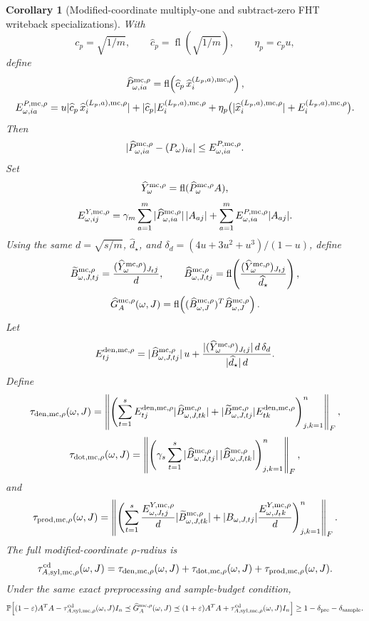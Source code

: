 \documentclass[11pt]{article}
\newcommand{\Prob}{\mathbb{P}}
\newcommand{\fl}{\operatorname{fl}}
\newcommand{\I}{I}
\newcommand{\eps}{\varepsilon}
\newtheorem{corollary}[theorem]{Corollary}
\theoremstyle{remark}
\begin{document}
\begin{corollary}[Modified-coordinate multiply-one and subtract-zero FHT writeback specializations]
With
\[
  c_p=\sqrt{1/m},\qquad
  \widehat c_p=\fl(\sqrt{1/m}),\qquad
  \eta_p=c_pu,
\]
define
\[
  \widehat P^{{\rm mc},\rho}_{\omega,ia}
  =
  \fl\!\left(
    \widehat c_p\,\widehat x_i^{(L_p,a),{\rm mc},\rho}
  \right),
\]
\[
  E^{P,{\rm mc},\rho}_{\omega,ia}
  =
  u|\widehat c_p\,\widehat x_i^{(L_p,a),{\rm mc},\rho}|
  +
  |\widehat c_p|E_i^{(L_p,a),{\rm mc},\rho}
  +
  \eta_p\bigl(
    |\widehat x_i^{(L_p,a),{\rm mc},\rho}|
    +E_i^{(L_p,a),{\rm mc},\rho}
  \bigr).
\]
Then
\[
  |\widehat P^{{\rm mc},\rho}_{\omega,ia}-(P_\omega)_{ia}|
  \le E^{P,{\rm mc},\rho}_{\omega,ia}.
\]
Set
\[
  \widehat Y^{{\rm mc},\rho}_\omega
  =
  \fl(\widehat P^{{\rm mc},\rho}_\omega A),
\]
\[
  E^{Y,{\rm mc},\rho}_{\omega,ij}
  =
  \gamma_m\sum_{a=1}^m
    |\widehat P^{{\rm mc},\rho}_{\omega,ia}|\,|A_{aj}|
  +
  \sum_{a=1}^m E^{P,{\rm mc},\rho}_{\omega,ia}|A_{aj}|.
\]
Using the same \(d=\sqrt{s/m}\), \(\widehat d_\star\), and
\(\delta_d=(4u+3u^2+u^3)/(1-u)\), define
\[
  \widetilde B^{{\rm mc},\rho}_{\omega,J,tj}
    =
    \frac{(\widehat Y^{{\rm mc},\rho}_\omega)_{J_tj}}{d},
  \qquad
  \widehat B^{{\rm mc},\rho}_{\omega,J,tj}
    =
    \fl\!\left(
      \frac{(\widehat Y^{{\rm mc},\rho}_\omega)_{J_tj}}
           {\widehat d_\star}
    \right),
\]
\[
  \widehat G_A^{{\rm mc},\rho}(\omega,J)
  =
  \fl\!\left(
    (\widehat B^{{\rm mc},\rho}_{\omega,J})^T
    \widehat B^{{\rm mc},\rho}_{\omega,J}
  \right).
\]
Let
\[
  E^{{\rm den},{\rm mc},\rho}_{tj}
  =
  |\widehat B^{{\rm mc},\rho}_{\omega,J,tj}|\,u
  +
  \frac{|(\widehat Y^{{\rm mc},\rho}_\omega)_{J_tj}|\,d\,\delta_d}
       {|\widehat d_\star|\,d}.
\]
Define
\[
  \tau_{{\rm den},{\rm mc},\rho}(\omega,J)
  =
  \left\|
    \left(
      \sum_{t=1}^s
      E^{{\rm den},{\rm mc},\rho}_{tj}
        |\widehat B^{{\rm mc},\rho}_{\omega,J,tk}|
      +
      |\widetilde B^{{\rm mc},\rho}_{\omega,J,tj}|
        E^{{\rm den},{\rm mc},\rho}_{tk}
    \right)_{j,k=1}^n
  \right\|_F,
\]
\[
  \tau_{{\rm dot},{\rm mc},\rho}(\omega,J)
  =
  \left\|
    \left(
      \gamma_s\sum_{t=1}^s
      |\widehat B^{{\rm mc},\rho}_{\omega,J,tj}|\,
      |\widehat B^{{\rm mc},\rho}_{\omega,J,tk}|
    \right)_{j,k=1}^n
  \right\|_F,
\]
and
\[
  \tau_{{\rm prod},{\rm mc},\rho}(\omega,J)
  =
  \left\|
    \left(
      \sum_{t=1}^s
      \frac{E^{Y,{\rm mc},\rho}_{\omega,J_tj}}{d}
        |\widetilde B^{{\rm mc},\rho}_{\omega,J,tk}|
      +
      |B_{\omega,J,tj}|
      \frac{E^{Y,{\rm mc},\rho}_{\omega,J_tk}}{d}
    \right)_{j,k=1}^n
  \right\|_F .
\]
The full modified-coordinate \(\rho\)-radius is
\[
  \tau_{A,{\rm syl},{\rm mc},\rho}^{\rm cd}(\omega,J)
  =
  \tau_{{\rm den},{\rm mc},\rho}(\omega,J)
  +
  \tau_{{\rm dot},{\rm mc},\rho}(\omega,J)
  +
  \tau_{{\rm prod},{\rm mc},\rho}(\omega,J).
\]
Under the same exact preprocessing and sample-budget condition,
\[
  \Prob\!\left[
    (1-\eps)A^TA-\tau_{A,{\rm syl},{\rm mc},\rho}^{\rm cd}(\omega,J)\I_n
    \preceq
    \widehat G_A^{{\rm mc},\rho}(\omega,J)
    \preceq
    (1+\eps)A^TA+\tau_{A,{\rm syl},{\rm mc},\rho}^{\rm cd}(\omega,J)\I_n
  \right]
  \ge
  1-\delta_{\rm pre}-\delta_{\rm sample}.
\]


\end{corollary}
\end{document}
